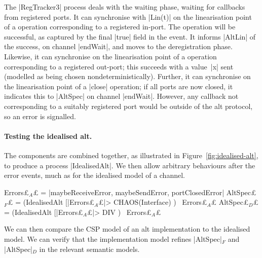 
The |RegTracker3| process %
deals with the
waiting phase, waiting for callbacks from registered ports.  It can
synchronise with |Lin(t)| on the linearisation point of a 
operation corresponding to a registered in-port.  The operation will be
successful, as captured by the final |true| field in the event.  It informs
|AltLin| of the success, on channel |endWait|, and moves to the deregistration
phase.  Likewise, it can synchronise on the linearisation point of a
 operation corresponding to a registered out-port; this
succeeds with a value~|x| sent (modelled as being chosen
nondeterministically).  Further, it can synchronise on the linearisation point
of a |close| operation; if all ports are now closed, it indicates this to
|AltSpec| on channel |endWait|.  However, any callback not corresponding to a
suitably registered port would be outside of the alt protocol, so an error is
signalled.


\paragraph{Testing the idealised alt.}

The components are combined together, as illustrated in
Figure~\ref{fig:idealised-alt}, to produce a process |IdealisedAlt|.  We
then allow arbitrary behaviours after the error events, much as for the
idealised model of a channel.
%
\begin{cspm}
Errors£$_A$£ = {|maybeReceiveError, maybeSendError, portClosedError|}
AltSpec£$_F$£ = (IdealisedAlt [|Errors£$_A$£|> CHAOS(Interface) ) \ Errors£$_A$£
AltSpec£$_D$£ = (IdealisedAlt [|Errors£$_A$£|> DIV ) \ Errors£$_A$£
\end{cspm}

We can then compare the CSP model of an alt implementation to the idealised
model.  We can verify that the implementation model refines |AltSpec|$_F$ and
|AltSpec|$_D$ in the relevant semantic models.

